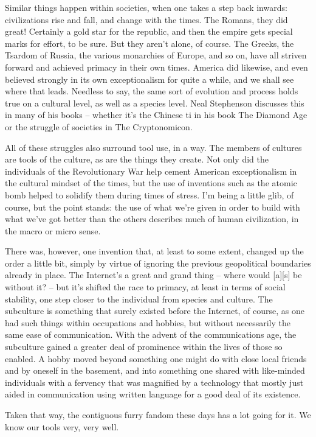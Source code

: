 Similar things happen within societies, when one takes a step back inwards: civilizations rise and fall, and change with the times.  The Romans, they did great!  Certainly a gold star for the republic, and then the empire gets special marks for effort, to be sure.  But they aren't alone, of course.  The Greeks, the Tsardom of Russia, the various monarchies of Europe, and so on, have all striven forward and achieved primacy in their own times.  America did likewise, and even believed strongly in its own exceptionalism for quite a while, and we shall see where that leads.  Needless to say, the same sort of evolution and process holds true on a cultural level, as well as a species level.  Neal Stephenson discusses this in many of his books -- whether it's the Chinese ti in his book The Diamond Age or the struggle of societies in The Cryptonomicon.

All of these struggles also surround tool use, in a way.  The members of cultures are tools of the culture, as are the things they create.  Not only did the individuals of the Revolutionary War help cement American exceptionalism in the cultural mindset of the times, but the use of inventions such as the atomic bomb helped to solidify them during times of stress.  I'm being a little glib, of course, but the point stands: the use of what we're given in order to build with what we've got better than the others describes much of human civilization, in the macro or micro sense.

There was, however, one invention that, at least to some extent, changed up the order a little bit, simply by virtue of ignoring the previous geopolitical boundaries already in place.  The Internet's a great and grand thing -- where would [a][s] be without it? -- but it's shifted the race to primacy, at least in terms of social stability, one step closer to the individual from species and culture.  The subculture is something that surely existed before the Internet, of course, as one had such things within occupations and hobbies, but without necessarily the same ease of communication.  With the advent of the communications age, the subculture gained a greater deal of prominence within the lives of those so enabled.  A hobby moved beyond something one might do with close local friends and by oneself in the basement, and into something one shared with like-minded individuals with a fervency that was magnified by a technology that mostly just aided in communication using written language for a good deal of its existence.

Taken that way, the contiguous furry fandom these days has a lot going for it.  We know our tools very, very well.

